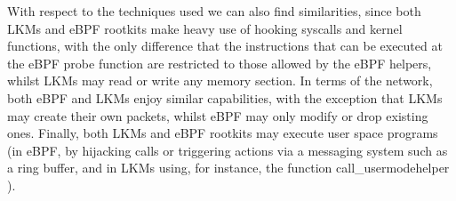 With respect to the techniques used we can also find similarities, since both LKMs and eBPF rootkits make heavy use of hooking syscalls and kernel functions, with the only difference that the instructions that can be executed at the eBPF probe function are restricted to those allowed by the eBPF helpers, whilst LKMs may read or write any memory section. In terms of the network, both eBPF and LKMs enjoy similar capabilities, with the exception that LKMs may create their own packets, whilst eBPF may only modify or drop existing ones. Finally, both LKMs and eBPF rootkits may execute user space programs (in eBPF, by hijacking calls or triggering actions via a messaging system such as a ring buffer, and in LKMs using, for instance, the function call\_usermodehelper \cite{usermode_helper_lkm}).


